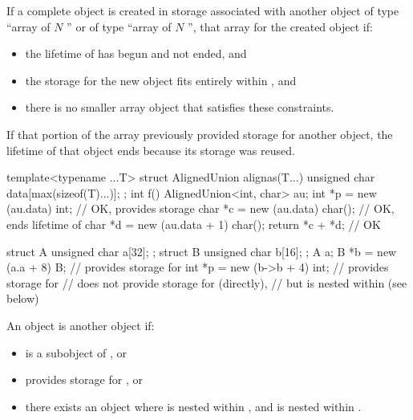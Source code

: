 \pnum
{}%
If a complete object is created
in storage associated with another object 
of type ``array of $N$ '' or
of type ``array of $N$ '',
that array 
for the created object if:
\begin{itemize}
\item
the lifetime of  has begun and not ended, and
\item
the storage for the new object fits entirely within , and
\item
there is no smaller array object that satisfies these constraints.
\end{itemize}
\begin{note}
If that portion of the array
previously provided storage for another object,
the lifetime of that object ends
because its storage was reused.
\end{note}
\begin{example}
\begin{codeblock}
template<typename ...T>
struct AlignedUnion {
  alignas(T...) unsigned char data[max(sizeof(T)...)];
};
int f() {
  AlignedUnion<int, char> au;
  int *p = new (au.data) int;           // OK,  provides storage
  char *c = new (au.data) char();       // OK, ends lifetime of 
  char *d = new (au.data + 1) char();
  return *c + *d;                       // OK
}

struct A { unsigned char a[32]; };
struct B { unsigned char b[16]; };
A a;
B *b = new (a.a + 8) B;                 //  provides storage for 
int *p = new (b->b + 4) int;            //  provides storage for 
                                        //  does not provide storage for  (directly),
                                        // but  is nested within  (see below)
\end{codeblock}
\end{example}

\pnum
{}%
An object  is  another object  if:
\begin{itemize}
\item
{} is a subobject of , or
\item
{} provides storage for , or
\item
there exists an object 
where  is nested within ,
and  is nested within .
\end{itemize}

